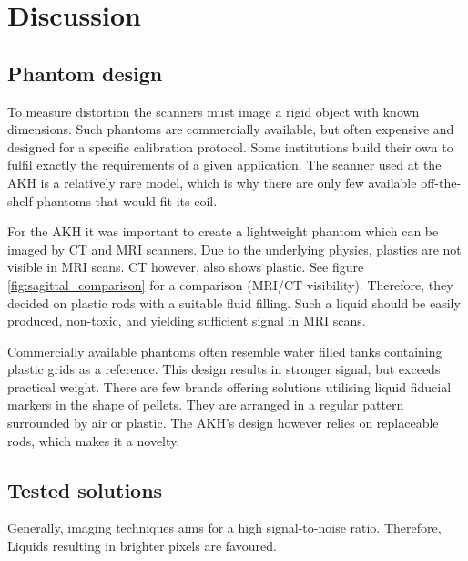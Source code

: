 
\chapter{Discussion}

\section{Phantom design}
    
To measure distortion the scanners must image a rigid object with known dimensions.
Such phantoms are commercially available, but often expensive and designed for a specific calibration protocol.
Some institutions build their own to fulfil exactly the requirements of a given application.
The scanner used at the AKH is a relatively rare model, which is why there are only few available off-the-shelf phantoms that would fit its coil.

For the AKH it was important to create a lightweight phantom which can be imaged by CT and MRI scanners.
Due to the underlying physics, plastics are not visible in MRI scans. CT however, also shows plastic.
See figure \ref{fig:sagittal_comparison} for a comparison (MRI/CT visibility).
Therefore, they decided on plastic rods with a suitable fluid filling.
Such a liquid should be easily produced, non-toxic, and yielding sufficient signal in MRI scans.

Commercially available phantoms often resemble water filled tanks containing plastic grids as a reference.
This design results in stronger signal, but exceeds practical weight.
There are few brands offering solutions utilising liquid fiducial markers in the shape of pellets.
They are arranged in a regular pattern surrounded by air or plastic.
The AKH's design however relies on replaceable rods, which makes it a novelty.


\section{Tested solutions}


Generally, imaging techniques aims for a high signal-to-noise ratio.
Therefore, Liquids resulting in brighter pixels are favoured.

